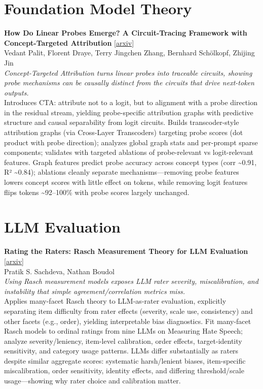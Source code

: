 \documentclass[12pt,letterpaper]{article}
\begin{document}
\medskip


\section*{Foundation Model Theory}

{\small\textbf{How Do Linear Probes Emerge? A Circuit-Tracing Framework with Concept-Targeted Attribution}} {\scriptsize[\href{https://arxiv.org/abs/2608.27510}{arxiv}]}\\
{\scriptsize Vedant Palit, Florent Draye, Terry Jingchen Zhang, Bernhard Sch\"olkopf, Zhijing Jin}\\

{\small\textit{Concept-Targeted Attribution turns linear probes into traceable circuits, showing probe mechanisms can be causally distinct from the circuits that drive next-token outputs.}}\\[1pt]
{\footnotesize Introduces CTA: attribute not to a logit, but to alignment with a probe direction in the residual stream, yielding probe-specific attribution graphs with predictive structure and causal separability from logit circuits. Builds transcoder-style attribution graphs (via Cross-Layer Transcoders) targeting probe scores (dot product with probe direction); analyzes global graph stats and per-prompt sparse components; validates with targeted ablations of probe-relevant vs logit-relevant features. Graph features predict probe accuracy across concept types (corr \textasciitilde{}0.91, R² \textasciitilde{}0.84); ablations cleanly separate mechanisms---removing probe features lowers concept scores with little effect on tokens, while removing logit features flips tokens \textasciitilde{}92--100\% with probe scores largely unchanged.}

\medskip


\section*{LLM Evaluation}

{\small\textbf{Rating the Raters: Rasch Measurement Theory for LLM Evaluation}} {\scriptsize[\href{https://arxiv.org/abs/2608.27463}{arxiv}]}\\
{\scriptsize Pratik S. Sachdeva, Nathan Boudol}\\

{\small\textit{Using Rasch measurement models exposes LLM rater severity, miscalibration, and instability that simple agreement/correlation metrics miss.}}\\[1pt]
{\footnotesize Applies many-facet Rasch theory to LLM-as-rater evaluation, explicitly separating item difficulty from rater effects (severity, scale use, consistency) and other facets (e.g., order), yielding interpretable bias diagnostics. Fit many-facet Rasch models to ordinal ratings from nine LLMs on Measuring Hate Speech; analyze severity/leniency, item-level calibration, order effects, target-identity sensitivity, and category usage patterns. LLMs differ substantially as raters despite similar aggregate scores: systematic harsh/lenient biases, item-specific miscalibration, order sensitivity, identity effects, and differing threshold/scale usage---showing why rater choice and calibration matter.}
\end{document}
